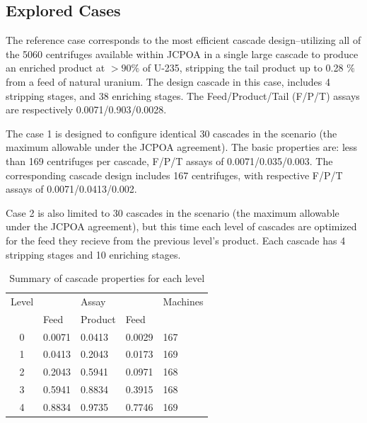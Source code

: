 \documentclass{anstrans}
\begin{document}
\subsection{Explored Cases}

The reference case corresponds to the most efficient cascade design--utilizing all
of the 5060 centrifuges available within JCPOA in a single large cascade to produce an enriched product at
$>90\%$ of U-235, stripping the tail product up to 0.28 $\%$ from a feed of
natural uranium.  The design cascade in this case, includes 4 stripping stages,
and 38 enriching stages. The Feed/Product/Tail (F/P/T) assays are respectively
0.0071/0.903/0.0028.


The case 1 is designed to configure identical 30 cascades in the scenario (the maximum
allowable under the JCPOA agreement). The basic
properties are: less than 169 centrifuges per cascade, F/P/T assays of
0.0071/0.035/0.003. The corresponding cascade design includes 167 centrifuges, with
respective F/P/T assays of 0.0071/0.0413/0.002.


Case 2 is also limited to 30 cascades in the scenario (the maximum allowable under
the JCPOA agreement), but this time each level of cascades are optimized for the feed they recieve from the previous level's product. Each cascade has 4 stripping stages and
10 enriching stages.

\begin{table}[htb]
\centering
  \caption{Summary of cascade properties for each level}
\begin{tabular}{cllll}
\toprule

Level   &           & Assay     &       & Machines  \\
        & Feed      & Product   & Feed  &           \\
\midrule
0       & 0.0071    & 0.0413    & 0.0029 & 167       \\
1       & 0.0413    & 0.2043    & 0.0173 & 169       \\
2       & 0.2043    & 0.5941    & 0.0971 & 168       \\
3       & 0.5941    & 0.8834    & 0.3915 & 168       \\
4       & 0.8834    & 0.9735    & 0.7746 & 169       \\

\bottomrule
\end{tabular}

  \label{tab:cascadelvl}
\end{table}
\end{document}
